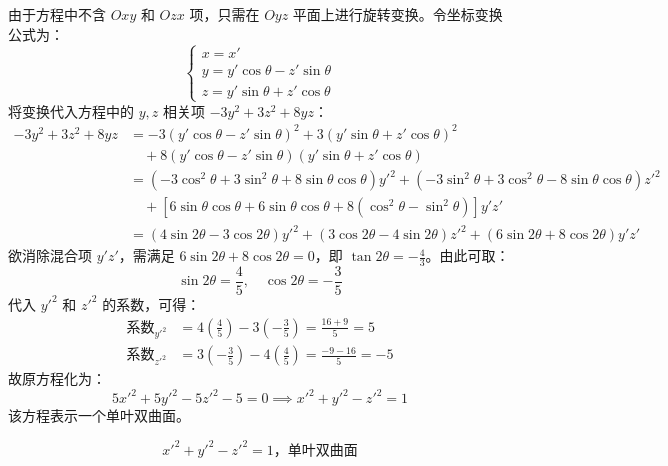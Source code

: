 \begin{solution}
    由于方程中不含 $Oxy$ 和 $Ozx$ 项，只需在 $Oyz$ 平面上进行旋转变换。令坐标变换公式为：
    \begin{equation}
        \begin{cases}
            x = x'                              \\
            y = y' \cos \theta - z' \sin \theta \\
            z = y' \sin \theta + z' \cos \theta
        \end{cases}
    \end{equation}
    将变换代入方程中的 $y, z$ 相关项 $-3y^2 + 3z^2 + 8yz$：
    \begin{equation}
        \begin{aligned}
            -3y^2 + 3z^2 + 8yz & = -3(y' \cos \theta - z' \sin \theta)^2 + 3(y' \sin \theta + z' \cos \theta)^2                                                            \\
                               & \quad + 8(y' \cos \theta - z' \sin \theta)(y' \sin \theta + z' \cos \theta)                                                               \\
                               & = (-3\cos^2 \theta + 3\sin^2 \theta + 8\sin \theta \cos \theta) y'^2 + (-3\sin^2 \theta + 3\cos^2 \theta - 8\sin \theta \cos \theta) z'^2 \\
                               & \quad + [6\sin \theta \cos \theta + 6\sin \theta \cos \theta + 8(\cos^2 \theta - \sin^2 \theta)] y'z'                                     \\
                               & = (4\sin 2\theta - 3\cos 2\theta) y'^2 + (3\cos 2\theta - 4\sin 2\theta) z'^2 + (6\sin 2\theta + 8\cos 2\theta) y'z'
        \end{aligned}
    \end{equation}
    欲消除混合项 $y'z'$，需满足 $6\sin 2\theta + 8\cos 2\theta = 0$，即 $\tan 2\theta = -\frac{4}{3}$。由此可取：
    \begin{equation}
        \sin 2\theta = \frac{4}{5}, \quad \cos 2\theta = -\frac{3}{5}
    \end{equation}
    代入 $y'^2$ 和 $z'^2$ 的系数，可得：
    \begin{equation}
        \begin{aligned}
            \text{系数}_{y'^2} & = 4 \left( \frac{4}{5} \right) - 3 \left( -\frac{3}{5} \right) = \frac{16 + 9}{5} = 5   \\
            \text{系数}_{z'^2} & = 3 \left( -\frac{3}{5} \right) - 4 \left( \frac{4}{5} \right) = \frac{-9 - 16}{5} = -5
        \end{aligned}
    \end{equation}
    故原方程化为：
    \begin{equation}
        5x'^2 + 5y'^2 - 5z'^2 - 5 = 0 \implies x'^2 + y'^2 - z'^2 = 1
    \end{equation}
    该方程表示一个单叶双曲面。

    \begin{equation}
        \boxed{x'^2 + y'^2 - z'^2 = 1，\text{单叶双曲面}}
    \end{equation}
\end{solution}


